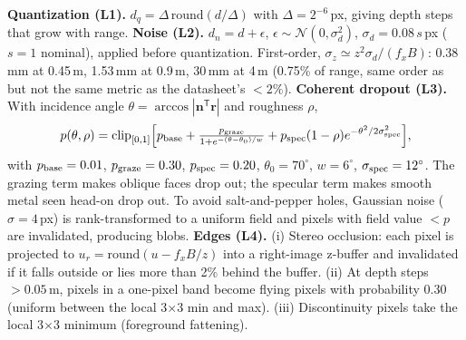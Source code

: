 \documentclass[10pt]{article}
\begin{document}
\textbf{Quantization (L1).} $d_q=\Delta\,\mathrm{round}(d/\Delta)$ with $\Delta=2^{-6}$\,px, giving depth steps that grow with range.
\textbf{Noise (L2).} $d_n=d+\epsilon$, $\epsilon\sim\mathcal N(0,\sigma_d^2)$, $\sigma_d=0.08\,s$\,px ($s=1$ nominal), applied before quantization. First-order, $\sigma_z\simeq z^2\sigma_d/(f_xB)$: 0.38\,mm at 0.45\,m, 1.53\,mm at 0.9\,m, 30\,mm at 4\,m (0.75\% of range, same order as but not the same metric as the datasheet's $<2\%$).
\textbf{Coherent dropout (L3).} With incidence angle $\theta=\arccos|\mathbf n^{\mathsf T}\mathbf r|$ and roughness $\rho$,
\[
p(\theta,\rho)=\operatorname{clip}_{[0,1]}\!\Big[p_{\rm base}+\tfrac{p_{\rm graze}}{1+e^{-(\theta-\theta_0)/w}}+p_{\rm spec}(1-\rho)e^{-\theta^2/2\sigma_{\rm spec}^2}\Big],
\]
with $p_{\rm base}=0.01$, $p_{\rm graze}=0.30$, $p_{\rm spec}=0.20$, $\theta_0=70^\circ$, $w=6^\circ$, $\sigma_{\rm spec}=12^\circ$. The grazing term makes oblique faces drop out; the specular term makes smooth metal seen head-on drop out. To avoid salt-and-pepper holes, Gaussian noise ($\sigma=4$\,px) is rank-transformed to a uniform field and pixels with field value $<p$ are invalidated, producing blobs.
\textbf{Edges (L4).} (i) Stereo occlusion: each pixel is projected to $u_r=\mathrm{round}(u-f_xB/z)$ into a right-image z-buffer and invalidated if it falls outside or lies more than 2\% behind the buffer. (ii) At depth steps $>0.05$\,m, pixels in a one-pixel band become flying pixels with probability 0.30 (uniform between the local 3$\times$3 min and max). (iii) Discontinuity pixels take the local 3$\times$3 minimum (foreground fattening).
\end{document}
